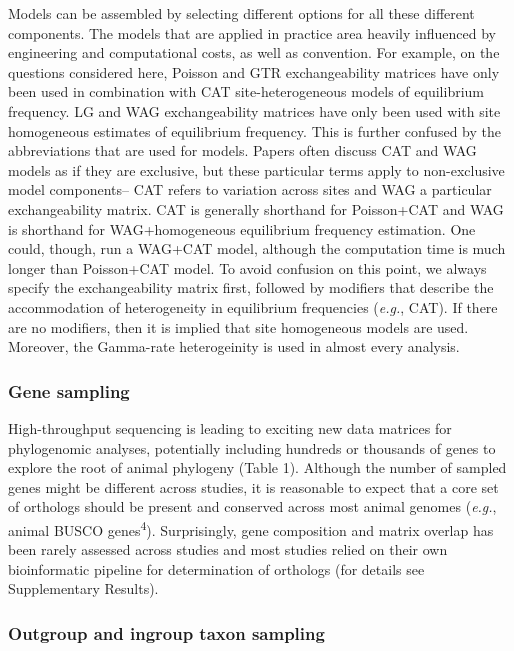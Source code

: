 \documentclass[]{article}
\begin{document}
Models can be assembled by selecting different options for all these
different components. The models that are applied in practice area
heavily influenced by engineering and computational costs, as well as
convention. For example, on the questions considered here, Poisson and
GTR exchangeability matrices have only been used in combination with CAT
site-heterogeneous models of equilibrium frequency. LG and WAG
exchangeability matrices have only been used with site homogeneous
estimates of equilibrium frequency. This is further confused by the
abbreviations that are used for models. Papers often discuss CAT and WAG
models as if they are exclusive, but these particular terms apply to
non-exclusive model components-- CAT refers to variation across sites
and WAG a particular exchangeability matrix. CAT is generally shorthand
for Poisson+CAT and WAG is shorthand for WAG+homogeneous equilibrium
frequency estimation. One could, though, run a WAG+CAT model, although
the computation time is much longer than Poisson+CAT model. To avoid
confusion on this point, we always specify the exchangeability matrix
first, followed by modifiers that describe the accommodation of
heterogeneity in equilibrium frequencies (\emph{e.g.}, CAT). If there
are no modifiers, then it is implied that site homogeneous models are
used. Moreover, the Gamma-rate heterogeinity is used in almost every
analysis.

\hypertarget{gene-sampling}{%
\subsubsection{Gene sampling}\label{gene-sampling}}

High-throughput sequencing is leading to exciting new data matrices for
phylogenomic analyses, potentially including hundreds or thousands of
genes to explore the root of animal phylogeny (Table 1). Although the
number of sampled genes might be different across studies, it is
reasonable to expect that a core set of orthologs should be present and
conserved across most animal genomes (\emph{e.g.}, animal BUSCO
genes\textsuperscript{4}). Surprisingly, gene composition and matrix
overlap has been rarely assessed across studies and most studies relied
on their own bioinformatic pipeline for determination of orthologs (for
details see Supplementary Results).

\hypertarget{outgroup-and-ingroup-taxon-sampling}{%
\subsubsection{Outgroup and ingroup taxon
sampling}\label{outgroup-and-ingroup-taxon-sampling}}
\end{document}
